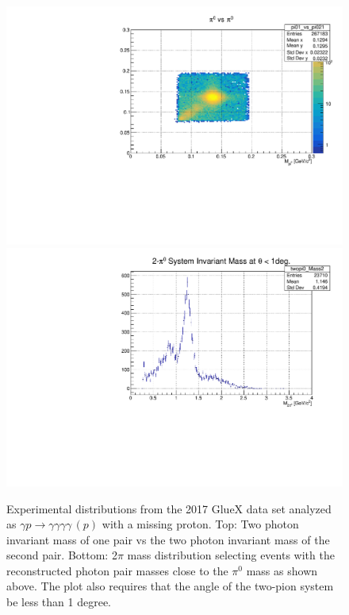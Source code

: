 \begin{figure}[tph] 
\centering
\includegraphics[width=4.75in]{figures/pi0VSpi0.pdf} \\
\centering
\includegraphics[width=4.75in]{figures/TwoPiInvMass.pdf}
\caption{Experimental distributions from the 2017 GlueX data set
  analyzed as $\gamma p\rightarrow \gamma \gamma \gamma \gamma\, (p)$
  with a missing proton. Top: Two photon invariant mass of one pair vs
  the two photon invariant mass of the second pair. Bottom: 2$\pi$
  mass distribution selecting events with the reconstructed photon
  pair masses close to the $\pi^0$ mass as shown above. The plot also
  requires that the angle of the two-pion system be less than 1
  degree.
\label{fig:TwoPiInvMass}}
\end{figure}

